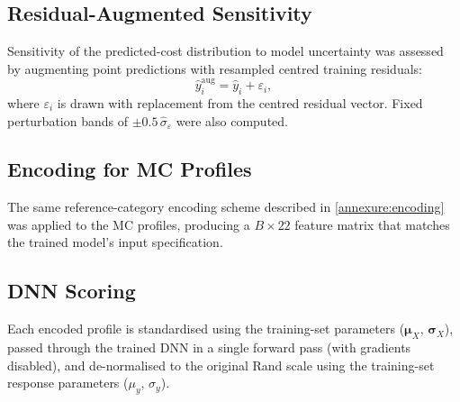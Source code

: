 \subsection{Residual-Augmented Sensitivity}
\label{annexure:mc_residual}

Sensitivity of the predicted-cost distribution to model uncertainty was assessed by augmenting point predictions with resampled centred training residuals:
\[
  \hat{y}_i^{\mathrm{aug}} = \hat{y}_i + \varepsilon_i,
\]
where $\varepsilon_i$ is drawn with replacement from the centred residual vector. Fixed perturbation bands of $\pm 0.5\,\hat{\sigma}_\varepsilon$ were also computed.

\subsection{Encoding for MC Profiles}
\label{annexure:mc_encode}

The same reference-category encoding scheme described in \ref{annexure:encoding} was applied to the MC profiles, producing a $B \times 22$ feature matrix that matches the trained model's input specification.

\subsection{DNN Scoring}
\label{annexure:mc_score}

Each encoded profile is standardised using the training-set parameters ($\boldsymbol{\mu}_X$, $\boldsymbol{\sigma}_X$), passed through the trained DNN in a single forward pass (with gradients disabled), and de-normalised to the original Rand scale using the training-set response parameters ($\mu_y$, $\sigma_y$).
